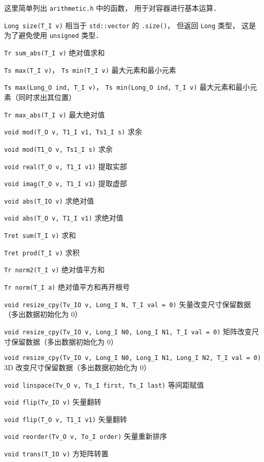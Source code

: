
\begin{issues}
\issueDraft
\end{issues}


这里简单列出 \verb|arithmetic.h| 中的函数， 用于对容器进行基本运算．

\verb|Long size(T_I v)| 相当于 \verb|std::vector| 的 \verb|.size()|， 但返回 \verb|Long| 类型， 这是为了避免使用 \verb|unsigned| 类型．

\verb|Tr sum_abs(T_I v)| 绝对值求和

\verb|Ts max(T_I v)|， \verb|Ts min(T_I v)| 最大元素和最小元素

\verb|Ts max(Long_O ind, T_I v)|， \verb|Ts min(Long_O ind, T_I v)| 最大元素和最小元素（同时求出其位置）

\verb|Tr max_abs(T_I v)| 最大绝对值

\verb|void mod(T_O v, T1_I v1, Ts1_I s)| 求余

\verb|void mod(T1_O v, Ts1_I s)| 求余

\verb|void real(T_O v, T1_I v1)| 提取实部

\verb|void imag(T_O v, T1_I v1)| 提取虚部

\verb|void abs(T_IO v)| 求绝对值

\verb|void abs(T_O v, T1_I v1)| 求绝对值

\verb|Tret sum(T_I v)| 求和

\verb|Tret prod(T_I v)| 求积

\verb|Tr norm2(T_I v)| 绝对值平方和

\verb|Tr norm(T_I a)| 绝对值平方和再开根号

\verb|void resize_cpy(Tv_IO v, Long_I N, T_I val = 0)| 矢量改变尺寸保留数据（多出数据初始化为 0）

\verb|void resize_cpy(Tv_IO v, Long_I N0, Long_I N1, T_I val = 0)| 矩阵改变尺寸保留数据（多出数据初始化为 0）

\verb|void resize_cpy(Tv_IO v, Long_I N0, Long_I N1, Long_I N2, T_I val = 0)| 3D 改变尺寸保留数据（多出数据初始化为 0）

\verb|void linspace(Tv_O v, Ts_I first, Ts_I last)| 等间距赋值

\verb|void flip(Tv_IO v)| 矢量翻转

\verb|void flip(T_O v, T1_I v1)| 矢量翻转

\verb|void reorder(Tv_O v, To_I order)| 矢量重新排序

\verb|void trans(T_IO v)| 方矩阵转置

